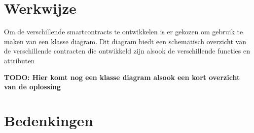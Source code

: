 \section{Werkwijze}
Om de verschillende smartcontracts te ontwikkelen is er gekozen om gebruik te maken van een klasse diagram. Dit diagram biedt een schematisch overzicht van de verschillende contracten die ontwikkeld zijn alsook de verschillende functies en attributen

\textbf{TODO: Hier komt nog een klasse diagram alsook een kort overzicht van de oplossing}

\section{Bedenkingen}
